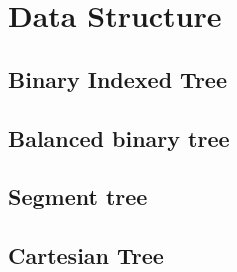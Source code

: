 \newpage
\section{Data Structure}

\subsection{Binary Indexed Tree}


\subsection{Balanced binary tree}

\subsection{Segment tree}

\subsection{Cartesian Tree}
